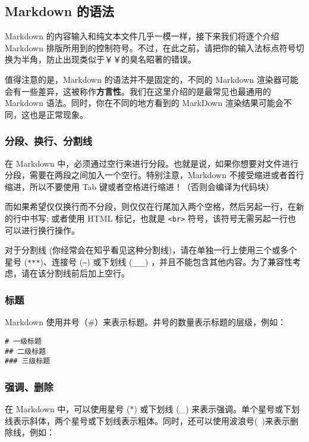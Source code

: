 \documentclass[../main.tex]{subfiles}
\begin{document}
\subsection{Markdown 的语法}

Markdown 的内容输入和纯文本文件几乎一模一样，接下来我们将逐个介绍 Markdown 排版所用到的控制符号。不过，在此之前，请把你的输入法标点符号切换为半角，防止出现类似于￥￥的臭名昭著的错误。

值得注意的是，Markdown 的语法并不是固定的，不同的 Markdown 渲染器可能会有一些差异，这被称作\textbf{方言性}。我们在这里介绍的是最常见也最通用的 Markdown 语法。同时，你在不同的地方看到的 MarkDown 渲染结果可能会不同，这也是正常现象。

\subsubsection{分段、换行、分割线}

在 Markdown 中，必须通过空行来进行分段。也就是说，如果你想要对文件进行分段，需要在两段之间加入一个空行。特别注意，Markdown 不接受缩进或者首行缩进，所以不要使用 Tab 键或者空格进行缩进！（否则会编译为代码块）

而如果希望仅仅换行而不分段，则仅仅在行尾加入两个空格，然后另起一行，在新的行中书写; 或者使用 HTML 标记，也就是 \texttt{<br>} 符号，该符号无需另起一行也可以进行换行操作。

对于分割线 (你经常会在知乎看见这种分割线)，请在单独一行上使用三个或多个星号 (\texttt{***})、连接号 (\texttt{---}) 或下划线 (\texttt{\_\_\_}) ，并且不能包含其他内容。为了兼容性考虑，请在该分割线前后加上空行。

\subsubsection{标题}

Markdown 使用井号（\#）来表示标题。井号的数量表示标题的层级，例如：

\begin{verbatim}
# 一级标题
## 二级标题
### 三级标题
\end{verbatim}

\subsubsection{强调、删除}

在 Markdown 中，可以使用星号 (*) 或下划线 (\_) 来表示强调。单个星号或下划线表示斜体，两个星号或下划线表示粗体。同时，还可以使用波浪号(~)来表示删除线，例如：
\end{document}
